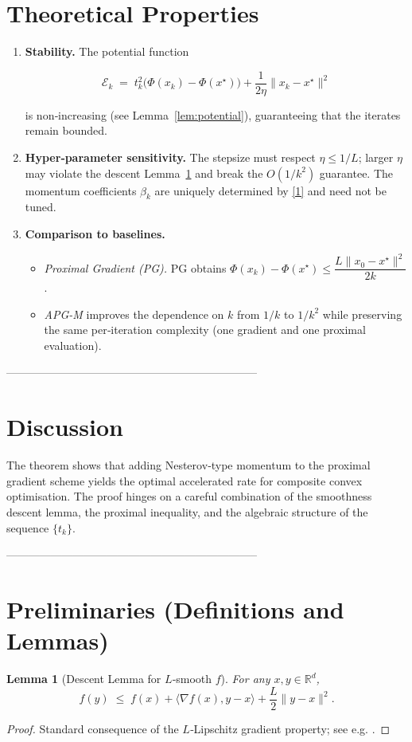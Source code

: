 \documentclass{article}
\newtheorem{lemma}{Lemma}
\newcommand{\R}{\mathbb{R}}
\begin{document}
\section*{Theoretical Properties}
\begin{enumerate}[label=\arabic*)]
\item \textbf{Stability.} The potential function  

\[
\mathcal{E}_k\;=\;t_k^{2}\bigl(\Phi(x_k)-\Phi(x^\star)\bigr)+\frac{1}{2\eta}\|x_k-x^\star\|^{2}
\]

is non‑increasing (see Lemma~\ref{lem:potential}), guaranteeing that the iterates remain bounded.

\item \textbf{Hyper‑parameter sensitivity.} The stepsize must respect $\eta\le1/L$; larger $\eta$ may violate the descent Lemma~\ref{lem:descent} and break the $O(1/k^2)$ guarantee. The momentum coefficients $\beta_k$ are uniquely determined by \eqref{1} and need not be tuned.

\item \textbf{Comparison to baselines.}
\begin{itemize}
\item \emph{Proximal Gradient (PG).} PG obtains $\Phi(x_k)-\Phi(x^\star)\le \dfrac{L\|x_0-x^\star\|^2}{2k}$.
\item \emph{APG-M} improves the dependence on $k$ from $1/k$ to $1/k^{2}$ while preserving the same per‑iteration complexity (one gradient and one proximal evaluation).
\end{itemize}
\end{enumerate}

--------------------------------------------------------------------

\section*{Discussion}
The theorem shows that adding Nesterov‑type momentum to the proximal gradient scheme yields the optimal accelerated rate for composite convex optimisation. The proof hinges on a careful combination of the smoothness descent lemma, the proximal inequality, and the algebraic structure of the sequence $\{t_k\}$.

--------------------------------------------------------------------

\section*{Preliminaries (Definitions and Lemmas)}
\begin{lemma}[Descent Lemma for $L$‑smooth $f$]\label{lem:descent}
For any $x,y\in\R^{d}$,
\[
f(y)\;\le\;f(x)+\langle\nabla f(x),y-x\rangle+\frac{L}{2}\|y-x\|^{2}.
\tag{4}
\]
\end{lemma}
\begin{proof}
Standard consequence of the $L$‑Lipschitz gradient property; see e.g. \cite{Nesterov2004}.
\end{proof}
\end{document}
